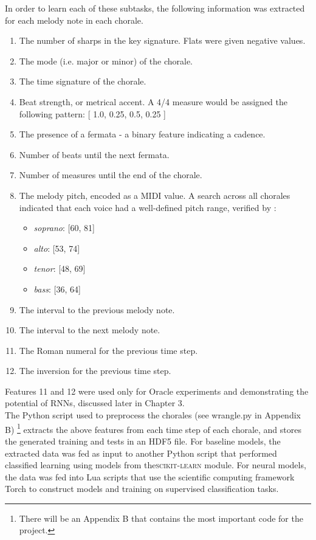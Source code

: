 \documentclass[11pt]{article}
\begin{document}
In order to learn each of these subtasks, the following information was extracted for each melody note in each chorale.

\begin{enumerate}
\item The number of sharps in the key signature. Flats were given negative values.
\item The mode (i.e. major or minor) of the chorale.
\item The time signature of the chorale.
\item Beat strength, or metrical accent. A 4/4 measure would be assigned the following pattern: [ 1.0, 0.25, 0.5, 0.25 ]
\item The presence of a fermata - a binary feature indicating a cadence.
\item Number of beats until the next fermata.
\item Number of measures until the end of the chorale.
\item The melody pitch, encoded as a MIDI value. A search across all chorales indicated that each voice had a well-defined pitch range, verified by \citet{madsen2002}: 
\begin{itemize}
\item \textit{soprano}: [60, 81]
\item \textit{alto}: [53, 74]
\item \textit{tenor}: [48, 69]
\item \textit{bass}: [36, 64]
\end{itemize}
\item The interval to the previous melody note.
\item The interval to the next melody note.
\item The Roman numeral for the previous time step.
\item The inversion for the previous time step.
\end{enumerate}

Features 11 and 12 were used only for Oracle experiments and demonstrating the potential of RNNs, discussed later in Chapter 3. \\

The Python script used to preprocess the chorales (see wrangle.py in Appendix B) \footnote{There will be an Appendix B that contains the most important code for the project.} extracts the above features from each time step of each chorale, and stores the generated training and tests in an HDF5 file. For baseline models, the extracted data was fed as input to another Python script that performed classified learning using models from the\textsc{scikit-learn} module. For neural models, the data was fed into Lua scripts that use the scientific computing framework Torch to construct models and training on supervised classification tasks.
\end{document}
